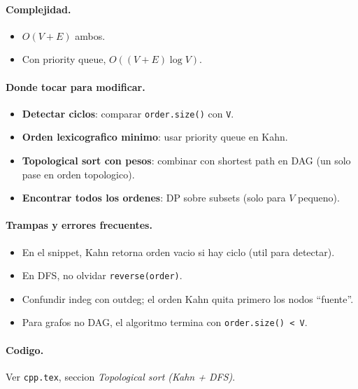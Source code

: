 \paragraph{Complejidad.}
\begin{itemize}\setlength\itemsep{0pt}
	\item $O(V + E)$ ambos.
	\item Con priority queue, $O((V + E) \log V)$.
\end{itemize}

\paragraph{Donde tocar para modificar.}
\begin{itemize}\setlength\itemsep{0pt}
	\item \textbf{Detectar ciclos}: comparar \texttt{order.size()} con \texttt{V}.
	\item \textbf{Orden lexicografico minimo}: usar priority queue en Kahn.
	\item \textbf{Topological sort con pesos}: combinar con shortest path en DAG (un solo pase en orden topologico).
	\item \textbf{Encontrar todos los ordenes}: DP sobre subsets (solo para $V$ pequeno).
\end{itemize}

\paragraph{Trampas y errores frecuentes.}
\begin{itemize}\setlength\itemsep{0pt}
	\item En el snippet, Kahn retorna orden vacio si hay ciclo (util para detectar).
	\item En DFS, no olvidar \texttt{reverse(order)}.
	\item Confundir indeg con outdeg; el orden Kahn quita primero los nodos ``fuente''.
	\item Para grafos no DAG, el algoritmo termina con \texttt{order.size() < V}.
\end{itemize}

\paragraph{Codigo.}
Ver \texttt{cpp.tex}, seccion \textit{Topological sort (Kahn + DFS)}.

\vspace{0.5em}

